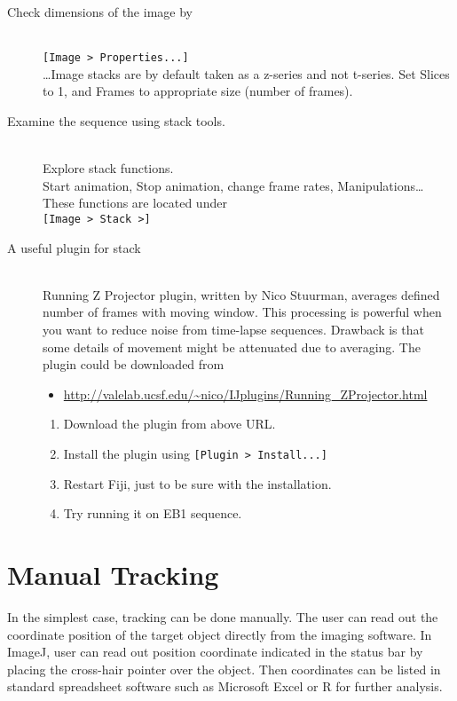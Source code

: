\documentclass[11pnt]{article}
\begin{document}
\begin{description}
\item[Check dimensions of the image by]\hfill\\
\verb"[Image > Properties...]"\\

\dots Image stacks are by default taken as a z-series and not t-series. Set Slices to 1, and Frames to appropriate size (number of frames).

\item[Examine the sequence using stack tools.]\hfill\\

Explore stack functions. \\
Start animation, Stop animation, change frame rates, Manipulations\dots These functions are located under\hfill\\

\verb"[Image > Stack >]"\\

\item[A useful plugin for stack]\hfill\\

Running Z Projector plugin, written by Nico Stuurman, averages defined number of frames with moving window. This processing is powerful when you want to reduce noise from time-lapse sequences. Drawback is that some details of movement might be attenuated due to averaging. The plugin could be downloaded from
\begin{itemize}
\item\url{http://valelab.ucsf.edu/~nico/IJplugins/Running_ZProjector.html}
\end{itemize}
\begin{enumerate}
\item Download the plugin from above URL.
\item Install the plugin using \verb"[Plugin > Install...]"
\item Restart Fiji, just to be sure with the installation. 
\item Try running it on EB1 sequence. 
\end{enumerate}
\end{description}

\section{Manual Tracking}

In the simplest case, tracking can be done manually. The user can read
out the coordinate position of the target object directly from the
imaging software. In ImageJ, user can read out position coordinate
indicated in the status bar by placing the cross-hair pointer over the
object. Then coordinates can be listed in standard spreadsheet software
such as Microsoft Excel or R for further analysis. 
\end{document}
